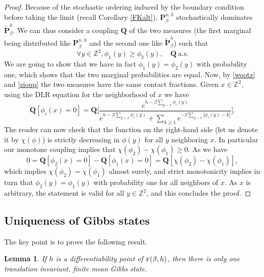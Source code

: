 \documentclass[10pt]{amsart}
\numberwithin{equation}{section}
\theoremstyle{plain}
\newtheorem{lemma}[theorem]{Lemma}
\theoremstyle{definition}
\newcommand{\bP}{{\ensuremath{\mathbf P}} }
\newcommand{\bQ}{{\ensuremath{\mathbf Q}} }
\newcommand{\bbZ}{{\ensuremath{\mathbb Z}} }
\newcommand{\gb}{\beta}
\newcommand{\tf}{\textsc{f}}
\begin{document}
\begin{proof}
Because of the stochastic ordering induced by the boundary condition before taking the limit (recall Corollary \ref{FKalt}),
$\bP^{n,h}_{\gb}$ stochastically dominates $\tilde \bP^{h}_{\gb}$.
We can thus consider a coupling $\bQ$ of the two measures (the first marginal being distributed like $\bP^{n,h}_{\gb}$ and the second one like $\tilde \bP^{h}_{\gb}$) such that
\begin{equation*}
\forall y\in \bbZ^2, \phi_1(y)\ge \phi_2(y), \quad \bQ\ \text{a.s.}
\end{equation*}
We are going to show that we have in fact $\phi_1(y)= \phi_2(y)$ with probability one, which shows that the two marginal probabilities are equal.
Now, by \eqref{wootz} and \eqref{zioup} the two measures have the same contact fractions.
Given $x\in \bbZ^2$, using the DLR equation for the neighborhood of $x$ we have
\begin{equation}\label{superdlr}
\bQ[\phi_i(x)=0]=
\bQ\biggl[ \frac{e^{h-\gb\sum_{y\sim x}\phi_i(y)}}{e^{h-\gb\sum_{y\sim x}\phi_i(y)}+ \sum_{k\ge 1} e^{-\gb\sum_{y\sim x}|\phi_i(y)-k| }} \biggr].
\end{equation}
The reader can now check that the function on the right-hand side (let us denote it by $\chi(\phi)$) is strictly decreasing in $\phi(y)$ for all $y$ neighboring $x$. In particular our monotone coupling implies that $\chi(\phi_2)-\chi(\phi_1)\ge 0$.
As we have
\begin{equation}
0= \bQ[\phi_2(x)=0]-\bQ[\phi_1(x)=0]
=\bQ\left[ \chi(\phi_2)-\chi(\phi_1)\right],
\end{equation}
which implies $\chi(\phi_2)=\chi(\phi_1)$ almost surely, and strict monotonicity implies in turn that
$ \phi_2(y)=\phi_1(y)$ with probability one for all neighbors of $x$. As $x$ is arbitrary, the statement is valid for all $y \in \bbZ^2$, and this concludes the proof.
\end{proof}

\subsection{Uniqueness of Gibbs states}\label{unik}

The key point is to prove the following result.
\begin{lemma}\label{labon}
If $h$ is a differentiability point of $\tf(\gb,h)$, then there is only one translation invariant, finite mean Gibbs state.
\end{lemma}
\end{document}
